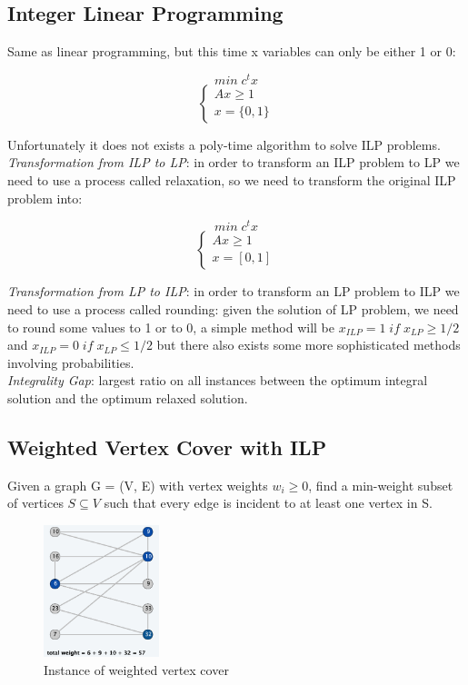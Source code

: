 \documentclass[11pt]{article}
\begin{document}
\subsection{Integer Linear Programming}

Same as linear programming, but this time x variables can only be either 1 or 0:

\[min \; c^{t}x\]
\[\begin{cases} Ax \geq 1 \\ x = \{0,1\} \end{cases}\]
 
Unfortunately it does not exists a poly-time algorithm to solve ILP problems.\\

\emph{Transformation from ILP to LP}: in order to transform an ILP problem to LP we need to use a process called relaxation, so we need to transform the original ILP problem into:

 \[min \; c^{t}x\]
\[\begin{cases} Ax \geq 1 \\ x = [0,1] \end{cases}\]

\emph{Transformation from LP to ILP}: in order to transform an LP problem to ILP we need to use a process called rounding: given the solution of LP problem, we need to round some values to 1 or to 0, a simple method will be $x_{ILP} = 1 \; if \; x_{LP} \geq 1/2$ and $x_{ILP} = 0 \; if \; x_{LP} \leq 1/2$ but there also exists some more sophisticated methods involving probabilities.\\

\emph{Integrality Gap}: largest ratio on all instances between the optimum integral solution and the optimum relaxed solution.

\subsection{Weighted Vertex Cover with ILP}

Given a graph G = (V, E) with vertex weights $w_{i} \geq 0$, find a min-weight subset of vertices $S \subseteq V$ such that every edge is incident to at least one vertex in S.

\begin{figure}[H]
		\centering
		\includegraphics[width=0.3\textwidth ]{wVertexCover}
		\caption{Instance of weighted vertex cover}
\end{figure}
\end{document}
